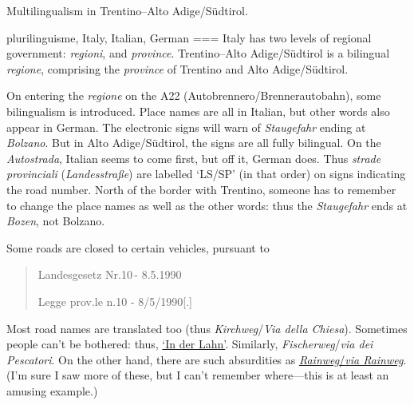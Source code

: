 Multilingualism in Trentino–Alto Adige/Südtirol.

plurilinguisme, Italy, Italian, German
===
Italy has two levels of regional government: \emph{regioni}, and \emph{province}. Trentino–Alto Adige/Südtirol is a bilingual \emph{regione}, comprising the \emph{province} of Trentino and Alto Adige/Südtirol.

On entering the \emph{regione} on the A22 (Autobrennero/Brennerautobahn), some bilingualism is introduced. Place names are all in Italian, but other words also appear in German. The electronic signs will warn of \emph{Staugefahr} ending at \emph{Bolzano}. But in Alto Adige/Südtirol, the signs are all fully bilingual. On the \emph{Autostrada}, Italian seems to come first, but off it, German does. Thus \emph{strade provinciali} (\emph{Landesstraße}) are labelled ‘LS/SP’ (in that order) on signs indicating the road number. North of the border with Trentino, someone has to remember to change the place names as well as the other words: thus the \emph{Staugefahr} ends at \emph{Bozen}, not Bolzano.

Some roads are closed to certain vehicles, pursuant to
\begin{quote}
    Landesgesetz Nr.10 - 8.5.1990

    Legge prov.le n.10 - 8/5/1990[.]
\end{quote}

Most road names are translated too (thus \emph{Kirchweg}/\emph{Via della Chiesa}). Sometimes people can’t be bothered: thus, \href{https://maps.app.goo.gl/TRsLnrE4dhKzfsH96}{‘In der Lahn’}. Similarly, \emph{Fischerweg}/\emph{via dei Pescatori}. On the other hand, there are such absurdities as \href{https://maps.app.goo.gl/cSQWEbV3V72D2hib6}{\emph{Rainweg}/\emph{via Rainweg}}. (I’m sure I saw more of these, but I can’t remember where—this is at least an amusing example.)